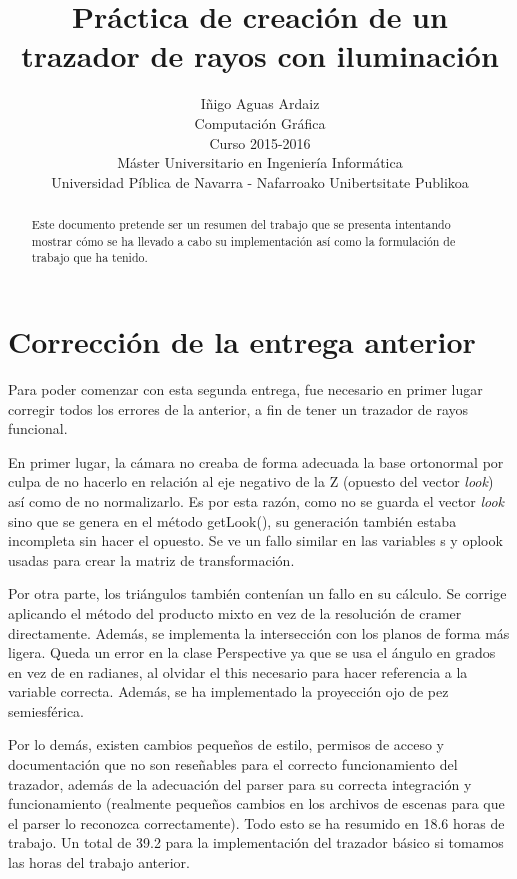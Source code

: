 \documentclass[a4paper,11pt,final]{scrartcl}
\title{Práctica de creación de un trazador de rayos con iluminación}
\author{Iñigo Aguas Ardaiz\\[10mm]Computación Gráfica\\Curso 2015-2016\\Máster Universitario en Ingenierí­a Informática\\ Universidad Píblica de Navarra - Nafarroako Unibertsitate Publikoa\\[10mm]}
\begin{document}
\maketitle

\begin{abstract}
Este documento pretende ser un resumen del trabajo que se presenta intentando mostrar cómo se ha llevado a cabo su implementación así­ como la formulación de trabajo que ha tenido.
\end{abstract}

\section{Corrección de la entrega anterior}

Para poder comenzar con esta segunda entrega, fue necesario en primer lugar corregir todos los errores de la anterior, a fin de tener un trazador de rayos funcional.

En primer lugar, la cámara no creaba de forma adecuada la base ortonormal  por culpa de no hacerlo en relación al eje negativo de la Z (opuesto del vector {\em look}) así como de no normalizarlo. Es por esta razón, como no se guarda el vector {\em look} sino que se genera en el método {\ttfamily getLook()}, su generación también estaba incompleta sin hacer el opuesto. Se ve un fallo similar en las variables {\ttfamily s} y {\ttfamily oplook} usadas para crear la matriz de transformación.

Por otra parte, los triángulos también contenían un fallo en su cálculo. Se corrige aplicando el método del producto mixto en vez de la resolución de cramer directamente. Además, se implementa la intersección con los planos de forma más ligera. Queda un error en la clase {\ttfamily Perspective} ya que se usa el ángulo en grados en vez de en radianes, al olvidar el {\ttfamily this} necesario para hacer referencia a la variable correcta. Además, se ha implementado la proyección ojo de pez semiesférica.

Por lo demás, existen cambios pequeños de estilo, permisos de acceso y documentación que no son reseñables para el correcto funcionamiento del trazador, además de la adecuación del parser para su correcta integración y funcionamiento (realmente pequeños cambios en los archivos de escenas para que el parser lo reconozca correctamente). Todo esto se ha resumido en 18.6 horas de trabajo. Un total de 39.2 para la implementación del trazador básico si tomamos las horas del trabajo anterior.
\end{document}
